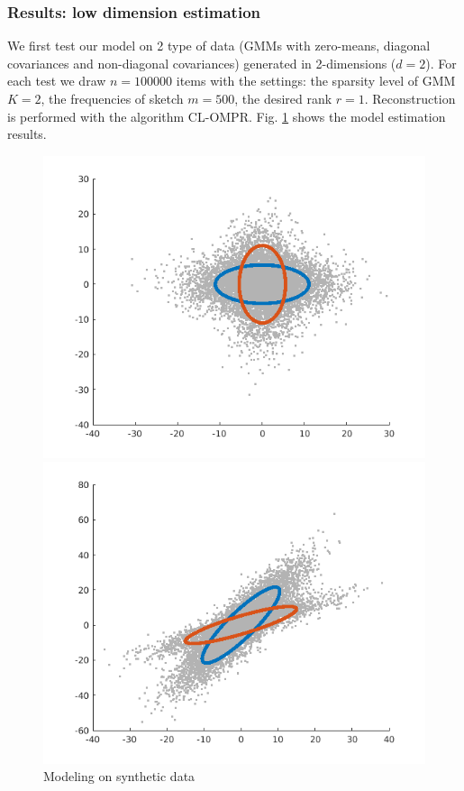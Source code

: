 \documentclass[12pt,a4paper]{article}
\begin{document}
\subsubsection{Results: low dimension estimation}
We first test our model on 2 type of data (GMMs with zero-means, diagonal covariances and non-diagonal covariances) generated in 2-dimensions ($d = 2$).
For each test we draw $n = 100000$ items with the settings: the sparsity level of GMM $K = 2$, the frequencies of sketch $m = 500$, the desired rank $r=1$.
Reconstruction is performed with the algorithm CL\hyp{}OMPR. Fig. \ref{fig:syn} shows the model estimation results. 
\begin{figure}[h]
    \begin{minipage}[t]{.45\textwidth}
      \centerline{\includegraphics[scale=0.5]{t1.png}}
    \end{minipage}
    \begin{minipage}[t]{.45\textwidth}
      \centerline{\includegraphics[scale=0.5]{t2.png}}
    \end{minipage}
    \caption{Modeling on synthetic data}
    \label{fig:syn}
\end{figure}
\end{document}
